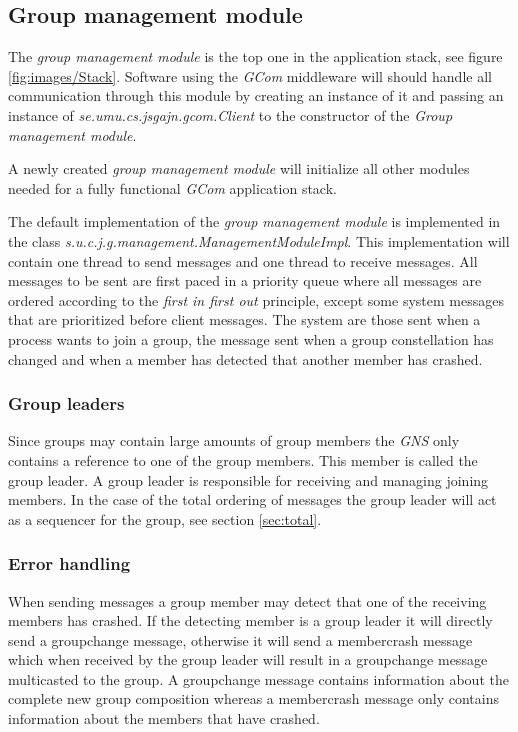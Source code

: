 \documentclass[titlepage, twocolumn, a4paper, 10pt]{article}
\begin{document}
\subsection{Group management module}\label{sec:group-management-module}
The \textit{group management module} is the top one in the application
stack, see figure \ref{fig:images/Stack}. Software using the
\textit{GCom} middleware will should handle all communication through
this module by creating an instance of it and passing an instance of
\textit{se.umu.cs.jsgajn.gcom.Client} to the constructor of the
\textit{Group management module}.

A newly created \textit{group management module} will initialize all
other modules needed for a fully functional \textit{GCom} application
stack.

The default implementation of the \textit{group management module} is
implemented in the class
\textit{s.u.c.j.g.management.ManagementModuleImpl}. This
implementation will contain one thread to send messages and one thread
to receive messages. All messages to be sent are first paced in a
priority queue where all messages are ordered according to the
\textit{first in first out} principle, except some system messages
that are prioritized before client messages. The system are those sent
when a process wants to join a group, the message sent when a group
constellation has changed and when a member has detected that another
member has crashed.

\subsubsection{Group leaders}\label{sec:group-leaders}
Since groups may contain large amounts of group members the
\textit{GNS} only contains a reference to one of the group members.
This member is called the group leader. A group leader is responsible
for receiving and managing joining members. In the case of the total
ordering of messages the group leader will act as a sequencer for the
group, see section \ref{sec:total}.

\subsubsection{Error handling}\label{sec:error-handling}
When sending messages a group member may detect that one of the
receiving members has crashed. If the detecting member is a group
leader it will directly send a groupchange message, otherwise it will
send a membercrash message which when received by the group leader
will result in a groupchange message multicasted to the group. A
groupchange message contains information about the complete new group
composition whereas a membercrash message only contains information
about the members that have crashed.
\end{document}
